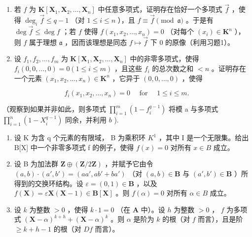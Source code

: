 \begin{enumerate}
\def\labelenumi{\alph{enumi})}
\setcounter{enumi}{1}
\item
  若 \(f\) 为 \(\mathbf{K}[\mathbf{X}_1, \mathbf{X}_2, \ldots, \mathbf{X}_n]\) 中任意多项式，证明存在恰好一个多项式 \(\vec{f}\) ，使得 \(\deg_i \vec{f} \leqslant q - 1\) （对 \(1 \leqslant i \leqslant n\) ），且 \(f \equiv \vec{f} \pmod{\mathfrak{a}}\) 。于是有 \(\deg \vec{f} \leqslant \deg f\) ；若 \(f\) 使得 \(f(x_1, x_2, \ldots, x_n) = 0\) （对每个 \((x_i) \in \mathbf{K}^n\) ），则 \(f\) 属于理想 \(\mathfrak{a}\) ，因而该理想是同态 \(f \mapsto \vec{f}\) 下 0 的原像（利用习题1）。
\item
  设 \(f_1, f_2, \ldots, f_m\) 为 \(\mathbf{K}[\mathbf{X}_1, \mathbf{X}_2, \ldots, \mathbf{X}_n]\) 中的非零多项式，使得 \(f_i(0, 0, \ldots, 0) = 0 (1 \leqslant i \leqslant m)\) ，且这些 \(f_i\) 的总次数之和 \(< n\) 。证明存在一个元素 \((x_1, x_2, \ldots, x_n) \in \mathbf{K}^n\) ，它异于 \((0, 0, \ldots, 0)\) ，使得
\end{enumerate}

\[
f _ {i} (x _ {1}, x _ {2}, \dots , x _ {n}) = 0 \quad \text { for } \quad 1 \leqslant i \leqslant m.
\]

（观察到如果并非如此，则多项式 \(\prod_{i=1}^{m} (1 - f_i^{q-1})\) 将模 a 与多项式 \(\prod_{i=1}^{n} (1 - X_i^{q-1})\) 同余，并利用 \(b\) ).

\begin{enumerate}
\def\labelenumi{\arabic{enumi})}
\setcounter{enumi}{6}
\item
  设 K 为含 q 个元素的有限域， B 为乘积环 \(K^{1}\) ，其中 I 是一个无限集。给出 B{[}X{]} 中一个非零多项式 f 的例子，使得 \(f(x)=0\) 对所有 \(x\in B\) 成立。
\item
  设 B 为加法群 \(\mathbf{Z} \oplus (\mathbf{Z}/2\mathbf{Z})\) ，并赋予它由令 \((a, b) \cdot (a', b') = (aa', ab' + ba')\) （对 \((a, b) \in \mathbf{B}\) 与 \((a', b') \in \mathbf{B}\) ）所得到的交换环结构。设 \(\varepsilon = (0, 1) \in \mathbf{B}\) ，以及 \(f(\mathbf{X}) = \varepsilon \mathbf{X}(\mathbf{X} - 1) \in \mathbf{B}[\mathbf{X}]\) 。则 \(f(\alpha) = 0\) 对所有 \(\alpha \in B\) 成立。
\item
  设 \(k\) 为整数 \(> 0\) ，使得 \(k \cdot 1 = 0\) （在 \(\mathbf{A}\) 中）。设 \(h\) 为整数 \(> 0\) ， \(f\) 为多项式 \((\mathbf{X} - \alpha)^{k + h} + (\mathbf{X} - \alpha)^k\) 。则 \(\alpha\) 是阶为 \(k\) 的根（对 \(f\) 而言），且是阶 \(\geqslant k + h - 1\) 的根（对 \(Df\) 而言）。
\end{enumerate}

